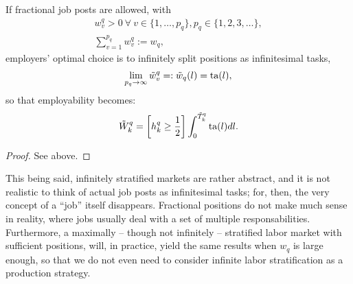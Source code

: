 \documentclass[hidelinks, nonatbib]{elsarticle}
\begin{document}
\begin{lemma}
    \label{isl}
    If fractional job posts are allowed, with
    \begin{gather}
        w_{v}^{q} 
        > 0
        \
        \forall
        \
        v \in \{1, \dots, p_q\}
        ,
        p_q \in \{1, 2, 3, \dots\}
        ,
        \\
        \sum_{v=1}^{p_q}
        w_{v}^{q}
        :=
        w_q
        ,
        \end{gather}
        employers' optimal choice is to infinitely split positions as infinitesimal tasks,
        \begin{gather}
            \lim_{p_q \rightarrow \infty}{
                \tilde{w}_{v}^{q}
            }
            =:
            \tilde{w}_{q}(l)
            =
            \text{ta}(l)
            ,
            \end{gather}
            so that employability becomes:
            \begin{gather}
                \tilde{W}_{k}^{q} 
                = 
                \left[
                    h_{k}^{q}
                    \geq
                    \frac{1}{2}
                \right]
                \int_{0}^{\tilde{T}_{k}^{q}}
                \text{ta}(l)
                dl
                .
                \end{gather}
    \begin{proof}
        See above.
    \end{proof}
\end{lemma}

This being said, infinitely stratified markets are rather abstract, and it is not realistic to think of actual job posts as infinitesimal tasks; for, then, the very concept of a ``job'' itself disappears. Fractional positions do not make much sense in reality, where jobs usually deal with a set of multiple responsabilities. Furthermore, a maximally -- though not infinitely -- stratified labor market with sufficient positions, will, in practice, yield the same results when $w_q$ is large enough, so that we do not even need to consider infinite labor stratification as a production strategy.
\end{document}
